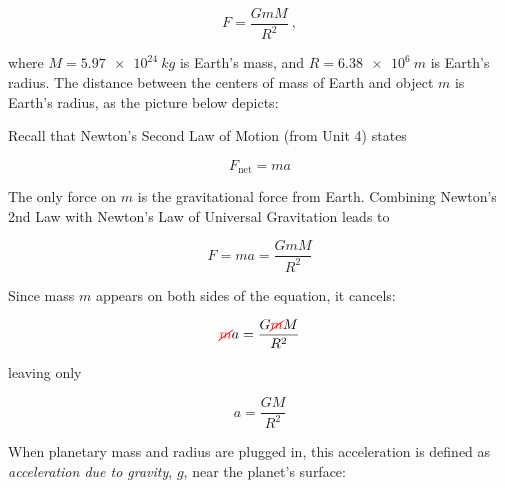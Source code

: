 \documentclass[dvipsnames]{article}
\numberwithin{equation}{section}
\numberwithin{figure}{section}
\begin{document}
\begin{equation*}
    F = \frac{G m M}{R^2}\ ,
\end{equation*}

where $M = \SI{5.97e24}{kg}$ is Earth's mass, and $R = \SI{6.38e6}{m}$ is Earth's radius. The distance between the centers of mass of Earth and object $m$ is Earth's radius, as the picture below depicts:


\begin{center}
    \centering
\end{center}

Recall that Newton's Second Law of Motion (from Unit 4) states

\begin{equation*}
    F_{\text{net}} = m a
\end{equation*}

The only force on $m$ is the gravitational force from Earth. Combining Newton's 2nd Law with Newton's Law of Universal Gravitation leads to

\begin{equation*}
    F = ma = \frac{G m M}{R^2}
\end{equation*}

Since mass $m$ appears on both sides of the equation, it cancels:

\begin{equation*}
    \textcolor{red}{\cancel{m}}a = \frac{G \textcolor{red}{\cancel{m}} M}{R^2}
\end{equation*}

leaving only

\begin{equation*}
    a = \frac{G M}{R^2}
\end{equation*}

When planetary mass and radius are plugged in, this acceleration is defined as \textit{acceleration due to gravity}, $g$, near the planet's surface:
\end{document}
